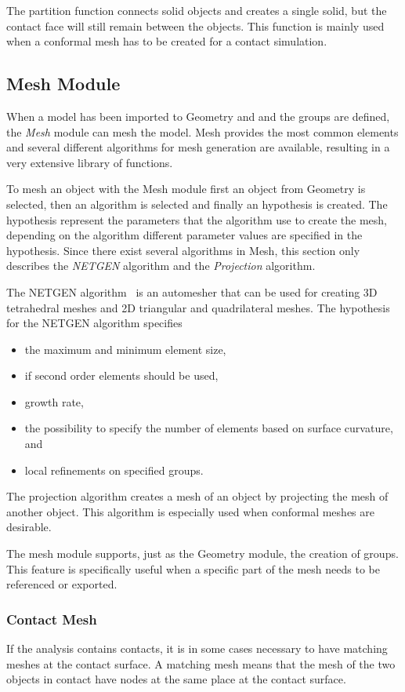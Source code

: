 The partition function connects solid objects and creates a single solid, but the contact face will still remain between the objects. This function is mainly used when a conformal mesh has to be created for a contact simulation.~\cite{salomedoc}

\subsection{Mesh Module} %
\label{sub:mesh_module}
When a model has been imported to Geometry and and the groups are defined, the \textit{Mesh} module can mesh the model. Mesh provides the most common elements and several different algorithms for mesh generation are available, resulting in a very extensive library of functions.

To mesh an object with the Mesh module first an object from Geometry is selected, then an algorithm is selected and finally an hypothesis is created. The hypothesis represent the parameters that the algorithm use to create the mesh, depending on the algorithm different parameter values are specified in the hypothesis. Since there exist several algorithms in Mesh, this section only describes the \textit{NETGEN} algorithm and the \textit{Projection} algorithm.

The NETGEN algorithm~\cite{netgen} is an automesher that can be used for creating 3D tetrahedral meshes and 2D triangular and quadrilateral meshes. The hypothesis for the NETGEN algorithm specifies
\begin{itemize}
	\item the maximum and minimum element size, 
	\item if second order elements should be used,
	\item growth rate,
	\item the possibility to specify the number of elements based on surface curvature, and
	\item local refinements on specified groups. 
\end{itemize}

The projection algorithm creates a mesh of an object by projecting the mesh of another object. This algorithm is especially used when conformal meshes are desirable.

The mesh module supports, just as the Geometry module, the creation of groups. This feature is specifically useful when a specific part of the mesh needs to be referenced or exported.

\subsubsection{Contact Mesh} %
\label{ssub:contact_mesh}
If the analysis contains contacts, it is in some cases necessary to have matching meshes at the contact surface. A matching mesh means that the mesh of the two objects in contact have nodes at the same place at the contact surface.

